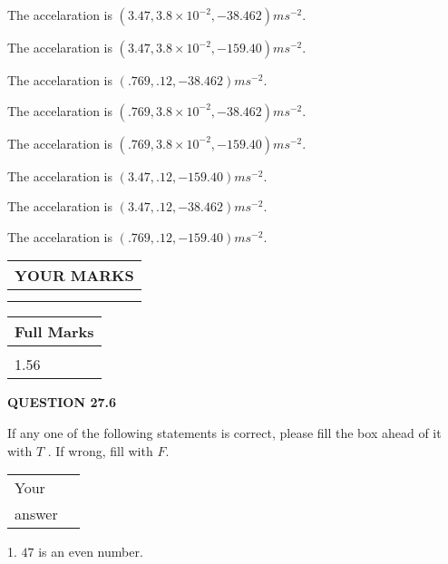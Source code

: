 \documentclass[12pt]{article}
\begin{document}
  
 
 
The accelaration is $  %
(
3.47,
3.8 \times 10^{-2},
-38.462)
ms^{-2} $.
 
 
The accelaration is $  %
(
3.47,
3.8 \times 10^{-2},
-159.40)
ms^{-2} $.
 
 
The accelaration is $  %
(
.769,
.12,
-38.462)
ms^{-2} $.
 
 
The accelaration is $  %
(
.769,
3.8 \times 10^{-2},
-38.462)
ms^{-2} $.
 
 
The accelaration is $  %
(
.769,
3.8 \times 10^{-2},
-159.40)
ms^{-2} $.
 
 
The accelaration is $  %
(
3.47,
.12,
-159.40)
ms^{-2} $.
 
 
The accelaration is $  %
(
3.47,
.12,
-38.462)
ms^{-2} $.
 
 
The accelaration is $  %
(
.769,
.12,
-159.40)
ms^{-2} $.
 
 
 

 

 
\vspace{0.3in}
  
\vspace{0.2in}
  
\noindent\begin{tabular}{|l|}
\hline
 YOUR MARKS  \\
\hline
 \\ 
 \\ 
\hline
\end{tabular}
\hspace{0.05in} \begin{tabular}{|l|}
\hline
 Full Marks  \\
\hline
 \\ 
1.56 \\
\hline
\end{tabular}
{\textbf{\Large{QUESTION
27.6 
}}}
  
  
If any one of the following statements is correct, please fill the box ahead of it with $T$ .
If wrong, fill with $F$.
 
\noindent\begin{tabular}{|l|l|}\hline Your&\hspace{.2in} \\ answer&\hspace{.2in} \\ \hline \end{tabular}
1. $ %
47$ is an  %
even number.
 
\end{document}
